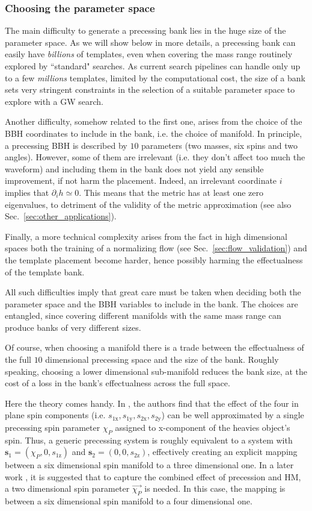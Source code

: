 \documentclass[twocolumn,showpacs,preprintnumbers,nofootinbib,prd,
superscriptaddress,10pt]{revtex4-2}
\begin{document}
\subsubsection{Choosing the parameter space}

The main difficulty to generate a precessing bank lies in the huge size of the parameter space. As we will show below in more details, a precessing bank can easily have {\it billions} of templates, even when covering the mass range routinely explored by ``standard" searches. As current search pipelines can handle only up to a few {\it millions} templates, limited by the computational cost, the size of a bank sets very stringent constraints in the selection of a suitable parameter space to explore with a GW search.

Another difficulty, somehow related to the first one, arises from the choice of the BBH coordinates to include in the bank, i.e. the choice of manifold.
In principle, a precessing BBH is described by $10$ parameters (two masses, six spins and two angles). However, some of them are irrelevant (i.e. they don't affect too much the waveform) and including them in the bank does not yield any sensible improvement, if not harm the placement.
Indeed, an irrelevant coordinate $i$ implies that $\partial_i h \simeq 0$. This means that the metric has at least one zero eigenvalues, to detriment of the validity of the metric approximation (see also Sec.~\ref{sec:other_applications}).

Finally, a more technical complexity arises from the fact in high dimensional spaces both the training of a normalizing flow (see Sec.~\ref{sec:flow_validation}) and the template placement become harder, hence possibly harming the effectualness of the template bank.

All such difficulties imply that great care must be taken when deciding both the parameter space and the BBH variables to include in the bank.
The choices are entangled, since covering different manifolds with the same mass range can produce banks of very different sizes.

Of course, when choosing a manifold there is a trade between the effectualness of the full $10$ dimensional precessing space and the size of the bank. Roughly speaking, choosing a lower dimensional sub-manifold reduces the bank size, at the cost of a loss in the bank's effectualness across the full space.

Here the theory comes handy. In \cite{Schmidt:2014iyl}, the authors find that the effect of the four in plane spin components (i.e. $s_\text{1x}, s_\text{1y}, s_\text{2x}, s_\text{2y}$) can be well approximated by a single precessing spin parameter $\chi_P$ assigned to x-component of the heavies object's spin.
Thus, a generic precessing system is roughly equivalent to a system with $\mathbf{s}_\text{1} = (\chi_P, 0, s_\text{1z})$ and $\mathbf{s}_\text{2} = (0, 0, s_\text{2z})$, effectively creating an explicit mapping between a six dimensional spin manifold to a three dimensional one.
In a later work \cite{Thomas:2020uqj}, it is suggested that to capture the combined effect of precession and HM, a two dimensional spin parameter $\vec{\chi_P}$ is needed. In this case, the mapping is between  a six dimensional spin manifold to a four dimensional one.
\end{document}
